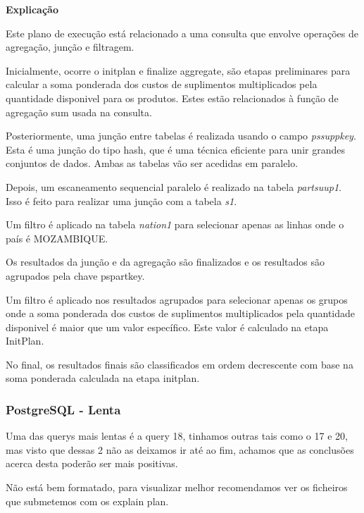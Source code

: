 \documentclass{article}
\begin{document}
\textbf{Explicação}\\
\texttt{}\par Este plano de execução está relacionado a uma consulta que envolve operações de agregação, junção e filtragem.

Inicialmente, ocorre o initplan e finalize aggregate, são etapas preliminares para calcular a soma ponderada dos custos de suplimentos multiplicados pela quantidade disponivel para os produtos. Estes estão relacionados à função de agregação sum usada na consulta.

Posteriormente, uma junção entre tabelas é realizada usando o campo \textit{ps\underline{}suppkey}. Esta é uma junção do tipo hash, que é uma técnica eficiente para unir grandes conjuntos de dados. Ambas as tabelas vão ser acedidas em paralelo. 

Depois, um escaneamento sequencial paralelo é realizado na tabela \textit{partsuup\underline{}1}. Isso é feito para realizar uma junção com a tabela \textit{s\underline{}1}.

Um filtro é aplicado na tabela \textit{nation\underline{}1} para selecionar apenas as linhas onde o país é MOZAMBIQUE.

Os resultados da junção e da agregação são finalizados e os resultados são agrupados pela chave ps\underline{}partkey.

Um filtro é aplicado nos resultados agrupados para selecionar apenas os grupos onde a soma ponderada dos custos de suplimentos multiplicados pela quantidade disponivel é maior que um valor específico. Este valor é calculado na etapa InitPlan.

No final, os resultados finais são classificados em ordem decrescente com base na soma ponderada calculada na etapa initplan.

\subsubsection{PostgreSQL - Lenta}
\texttt{}\par Uma das querys mais lentas é a query 18, tinhamos outras tais como o 17 e 20, mas visto que dessas 2 não as deixamos ir até ao fim, achamos que as conclusões acerca desta poderão ser mais positivas.

Não está bem formatado, para visualizar melhor recomendamos ver os ficheiros que submetemos com os explain plan.
\end{document}
